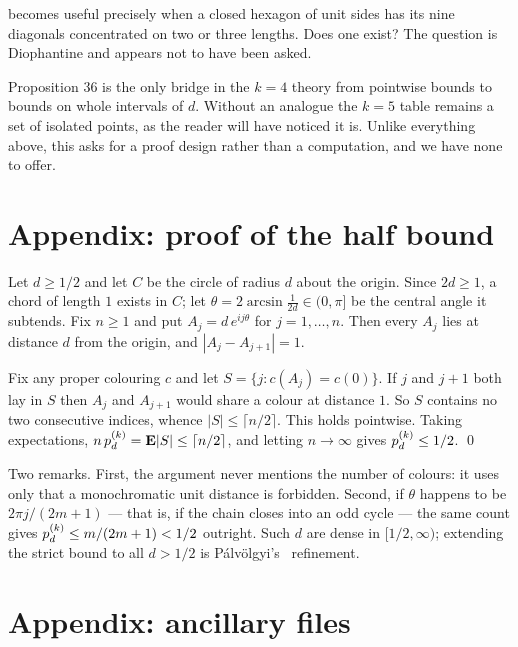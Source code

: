 \begin{problem}
 becomes useful precisely when a closed hexagon of unit sides
has its nine diagonals concentrated on two or three lengths. Does one exist? The
question is Diophantine and appears not to have been asked.
\end{problem}

\begin{problem}
Proposition 36 is the only bridge in the $k=4$ theory from pointwise bounds to
bounds on whole intervals of $d$. Without an analogue the $k=5$ table remains a
set of isolated points, as the reader will have noticed it is. Unlike everything
above, this asks for a proof design rather than a computation, and we have none
to offer.
\end{problem}

\section{Appendix: proof of the half bound}
\label{sec:appendixA}

Let $d\ge1/2$ and let $C$ be the circle of radius $d$ about the origin. Since
$2d\ge1$, a chord of length $1$ exists in $C$; let
$\theta=2\arcsin\frac{1}{2d}\in(0,\pi]$ be the central angle it subtends. Fix
$n\ge1$ and put $A_j=d\,e^{ij\theta}$ for $j=1,\dots,n$. Then every $A_j$ lies at
distance $d$ from the origin, and $|A_j-A_{j+1}|=1$.

Fix any proper colouring $c$ and let $S=\{j: c(A_j)=c(0)\}$. If $j$ and $j+1$
both lay in $S$ then $A_j$ and $A_{j+1}$ would share a colour at distance $1$.
So $S$ contains no two consecutive indices, whence $|S|\le\lceil n/2\rceil$.
This holds pointwise. Taking expectations, $n\,p^{(k)}_{d}=\mathbf{E}|S|\le\lceil
n/2\rceil$, and letting $n\to\infty$ gives $p^{(k)}_{d}\le1/2$. \qed

Two remarks. First, the argument never mentions the number of colours: it uses
only that a monochromatic unit distance is forbidden. Second, if $\theta$ happens
to be $2\pi j/(2m+1)$ --- that is, if the chain closes into an odd cycle --- the
same count gives $p^{(k)}_{d}\le m/(2m+1)<1/2$ outright. Such $d$ are dense in
$[1/2,\infty)$; extending the strict bound to all $d>1/2$ is P\'alv\"olgyi's~\cite{Polymath16}
refinement.

\section{Appendix: ancillary files}
\label{sec:ancillaryA}

